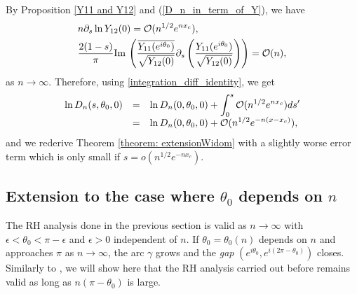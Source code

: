 \documentclass[11pt,fleqn]{article}
\numberwithin{equation}{section}
\def\Im{{\rm Im \,}}
\def\bigO{{\cal O}}
\begin{document}
By Proposition \ref{Y11 and Y12} and (\ref{D_n_in_term_of_Y}), we have
\begin{align}
&n \partial_{s}\ln Y_{12}(0) = \bigO(n^{1/2}e^{nx_c}),\\
& \frac{2(1-s)}{\pi} \Im \left( \frac{\overline{Y_{11}(e^{i\theta_{0}})}}{\sqrt{Y_{12}(0)}} \partial_{s} \left( \frac{Y_{11}(e^{i\theta_{0}})}{\sqrt{Y_{12}(0)}} \right) \right) = \bigO(n),
\end{align}
as $n\to\infty$.
Therefore, using \eqref{integration_diff_identity}, we get
\begin{equation*}
\begin{array}{r c l}
\displaystyle \ln D_{n}(s,\theta_{0},0) & = & \displaystyle \ln D_{n}(0,\theta_{0},0) + \int_{0}^{s} \bigO(n^{1/2}e^{nx_c}) ds^{\prime} \\
& = & \displaystyle \ln D_{n}(0,\theta_{0},0) + \bigO(n^{1/2}e^{-n(x-x_{c})}),
\end{array}
\end{equation*} and we rederive Theorem \ref{theorem: extensionWidom} with a slightly worse error term which is only small if $s=o(n^{1/2}e^{-nx_c})$.







\subsection{Extension to the case where $\theta_0$ depends on $n$}
The RH analysis done in the previous section is valid as $n\to\infty$ with $\epsilon<\theta_0<\pi-\epsilon$ and $\epsilon>0$ independent of $n$. If $\theta_0=\theta_0(n)$ depends on $n$ and approaches $\pi$ as $n\to\infty$, the arc $\gamma$ grows and the {\em gap} $(e^{i\theta_0},e^{i(2\pi-\theta_0)})$ closes. 
Similarly to \cite{Krasovsky}, we will show here that the RH analysis carried out before remains valid as long as $n(\pi-\theta_0)$ is large.
\end{document}
